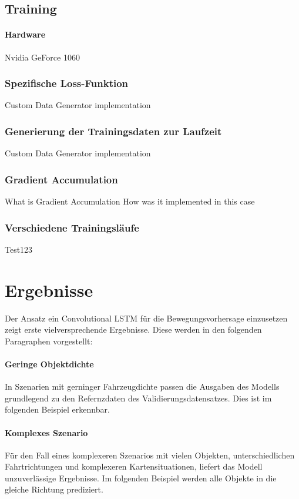 \documentclass[12pt]{article}
\begin{document}
    \subsection{Training}
        \paragraph{Hardware} Nvidia GeForce 1060
        \subsubsection{Spezifische Loss-Funktion}
	        Custom Data Generator implementation
        \subsubsection{Generierung der Trainingsdaten zur Laufzeit}
	        Custom Data Generator implementation
        
        \subsubsection{Gradient Accumulation}
		    What is Gradient Accumulation
            How was it implemented in this case
        \subsubsection{Verschiedene Trainingsläufe}
            Test123
\pagebreak
\section{Ergebnisse}
    Der Ansatz ein Convolutional LSTM für die Bewegungsvorhersage einzusetzen zeigt erste vielversprechende Ergebnisse. 
    Diese werden in den folgenden Paragraphen vorgestellt:

    \paragraph{Geringe Objektdichte} In Szenarien mit gerninger Fahrzeugdichte passen die Ausgaben des Modells grundlegend zu den Refernzdaten des Validierungsdatensatzes.
    Dies ist im folgenden Beispiel erkennbar. %

    \paragraph{Komplexes Szenario} Für den Fall eines komplexeren Szenarios mit vielen Objekten, unterschiedlichen Fahrtrichtungen und komplexeren Kartensituationen, liefert das Modell unzuverlässige Ergebnisse.
    Im folgenden Beispiel werden alle Objekte in die gleiche Richtung prediziert. %
\end{document}
